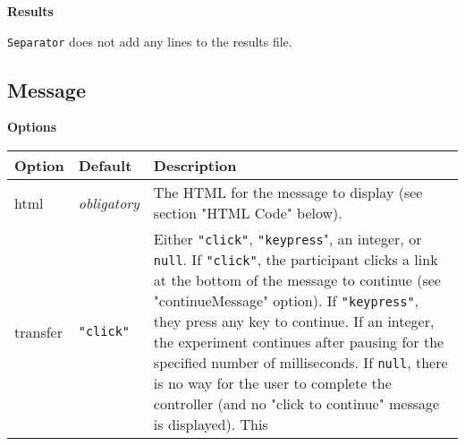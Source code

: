 \documentclass[
]{article}
\begin{document}
\textbf{Results}

\texttt{Separator} does not add any lines to the results file.

\hypertarget{message}{%
\subsection{Message}\label{message}}

\textbf{Options}

\begin{RaggedRight}\small\begin{longtable}[]{p{1.7in}p{1in}p{3.15in}}
\toprule
\begin{minipage}[b]{0.19\columnwidth}\raggedright
\textbf{Option}\strut
\end{minipage} & \begin{minipage}[b]{0.13\columnwidth}\raggedright
\textbf{Default}\strut
\end{minipage} & \begin{minipage}[b]{0.59\columnwidth}\raggedright
\textbf{Description}\strut
\end{minipage}\tabularnewline
\midrule
\endhead
\begin{minipage}[t]{0.19\columnwidth}\raggedright
html\strut
\end{minipage} & \begin{minipage}[t]{0.13\columnwidth}\raggedright
\emph{obligatory}\strut
\end{minipage} & \begin{minipage}[t]{0.59\columnwidth}\raggedright
The HTML for the message to display (see section "HTML Code"
below).\strut
\end{minipage}\tabularnewline
\begin{minipage}[t]{0.19\columnwidth}\raggedright
transfer\strut
\end{minipage} & \begin{minipage}[t]{0.13\columnwidth}\raggedright
\texttt{"click"}\strut
\end{minipage} & \begin{minipage}[t]{0.59\columnwidth}\raggedright
Either \texttt{"click"}, \texttt{"keypress}", an integer, or
\texttt{null}. If \texttt{"click"}, the participant clicks a link at the
bottom of the message to continue (see "continueMessage" option). If
\texttt{"keypress"}, they press any key to continue. If an integer, the
experiment continues after pausing for the specified number of
milliseconds. If \texttt{null}, there is no way for the user to complete
the controller (and no "click to continue" message is displayed). This

\end{minipage}
\end{longtable}
\end{RaggedRight}
\end{document}
